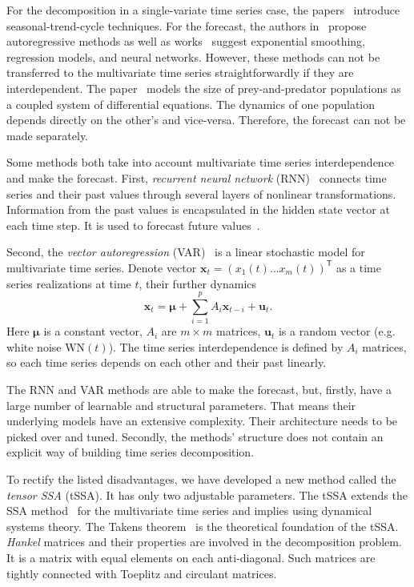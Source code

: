 \documentclass[referee, pdflatex, sn-mathphys-num]{sn-jnl}
\theoremstyle{definition}
\theoremstyle{plain}
\begin{document}
	For the decomposition in a single-variate time series case, the papers~\cite{enders2010applied, x11, cleveland90} introduce seasonal-trend-cycle techniques. For the forecast, the authors in~\cite{Box_Jenkins_methodology} propose autoregressive methods as well as works~\cite{3b1355aedd1041f1853e609a410576f3, enders2010applied} suggest exponential smoothing, regression models, and neural networks. However, these methods can not be transferred to the multivariate time series straightforwardly if they are interdependent. The paper~\cite{Volterra:1928} models the size of prey-and-predator populations as a coupled system of differential equations. The dynamics of one population depends directly on the other's and vice-versa. Therefore, the forecast can not be made separately. 
	
	Some methods both take into account multivariate time series interdependence and make the forecast. First, \emph{recurrent neural network} (RNN)~\cite{neco} connects time series and their past values through several layers of nonlinear transformations. Information from the past values is encapsulated in the hidden state vector at each time step. It is used to forecast future values~\cite{TEALAB2018334}.
	
	Second, the	\emph{vector autoregression} (VAR)~\cite{VAR_model1, doi:10.1080/01621459.1962.10480664} is a linear stochastic model for multivariate time series. Denote vector $ \mathbf{x}_t = (x_1(t) \ldots x_m(t))^{\mathsf{T}} $ as a time series realizations at time $ t $, their further dynamics	\begin{equation*}
		\mathbf{x}_t = \boldsymbol{\mu} + \sum\limits_{i = 1}^p A_i \mathbf{x}_{t - i} + \mathbf{u}_t.
	\end{equation*} Here  $ \boldsymbol{\mu} $ is a constant vector, $ A_i $ are $ m \times m $ matrices, $ \mathbf{u}_t $ is a random vector (e.g. white noise $ \text{WN}(t) $). The time series interdependence is defined by $ A_i $ matrices, so each time series depends on each other and their past linearly.
	
	The RNN and VAR methods are able to make the forecast, but, firstly, have a large number of learnable and structural parameters. That means their underlying models have an extensive complexity. Their architecture needs to be picked over and tuned. Secondly, the methods' structure does not contain an explicit way of building time series decomposition.
	
	To rectify the listed disadvantages, we have developed a new method called the \emph{tensor SSA} (tSSA). It has only two adjustable parameters. The tSSA extends the SSA method~\cite{ecfb9dc578be43ae9ee8fc88b8ff9151} for the multivariate time series and implies using dynamical systems theory. The Takens theorem~\cite{citeulike:2735031} is the theoretical foundation of the tSSA. \emph{Hankel} matrices and their properties are involved in the decomposition problem. It is a matrix with equal elements on each anti-diagonal. Such matrices are tightly connected with Toeplitz and circulant matrices.
	
\end{document}
